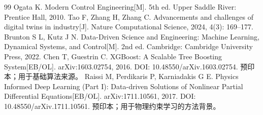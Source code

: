 \documentclass[UTF8]{midterm}
\begin{document}
\begin{thebibliography}{99}
 Ogata K. Modern Control Engineering[M]. 5th ed. Upper Saddle River: Prentice Hall, 2010.
 Tao F, Zhang H, Zhang C. Advancements and challenges of digital twins in industry[J]. Nature Computational Science, 2024, 4(3): 169--177.
 Brunton S L, Kutz J N. Data-Driven Science and Engineering: Machine Learning, Dynamical Systems, and Control[M]. 2nd ed. Cambridge: Cambridge University Press, 2022.
 Chen T, Guestrin C. XGBoost: A Scalable Tree Boosting System[EB/OL]. arXiv:1603.02754, 2016. DOI: 10.48550/arXiv.1603.02754. 预印本；用于基础算法来源。
 Raissi M, Perdikaris P, Karniadakis G E. Physics Informed Deep Learning (Part I): Data-driven Solutions of Nonlinear Partial Differential Equations[EB/OL]. arXiv:1711.10561, 2017. DOI: 10.48550/arXiv.1711.10561. 预印本；用于物理约束学习的方法背景。
\end{thebibliography}
\end{document}
